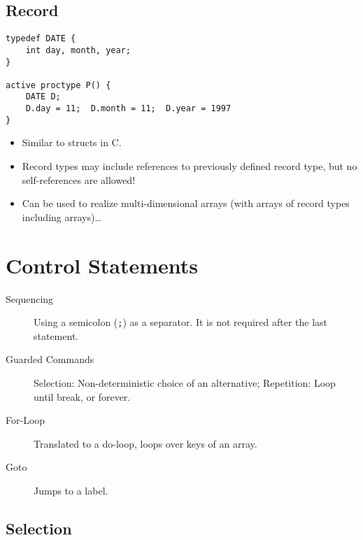 \documentclass[a4paper, 11pt, accentcolor = tud3b]{tudreport}
\newcommand{\inlinePromela}[1]{\lstinline[language = PROMELA]|#1|}
\begin{document}
			\subsection{Record}
				\begin{lstlisting}[caption = { PROMELA Records }, label = lst:promelaRecord, language = PROMELA]
typedef DATE {
	int day, month, year;
}

active proctype P() {
	DATE D;
	D.day = 11;  D.month = 11;  D.year = 1997
}
				\end{lstlisting}
				
				\begin{itemize}
					\item Similar to structs in C.
					\item Record types may include references to previously defined record type, but no self-references are allowed!
					\item Can be used to realize multi-dimensional arrays (with arrays of record types including arrays)\dots
				\end{itemize}

		\section{Control Statements}
			\begin{description}
				\item[Sequencing] Using a semicolon (\inlinePromela{;}) as a separator. It is not required after the last statement.
				\item[Guarded Commands] Selection: Non-deterministic choice of an alternative; Repetition: Loop until break, or forever.
				\item[For-Loop] Translated to a do-loop, loops over keys of an array.
				\item[Goto] Jumps to a label.
			\end{description}

			\subsection{Selection}
				
				
\end{document}
